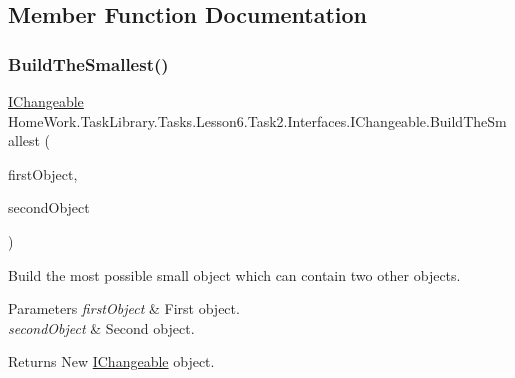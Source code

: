 \subsection{Member Function Documentation}
\mbox{\label{interface_home_work_1_1_task_library_1_1_tasks_1_1_lesson6_1_1_task2_1_1_interfaces_1_1_i_changeable_a3ec62d87fd0e526760dcf7f929ac74ae}} 
\subsubsection{\texorpdfstring{BuildTheSmallest()}{BuildTheSmallest()}}
{\footnotesize\ttfamily \mbox{\hyperlink{interface_home_work_1_1_task_library_1_1_tasks_1_1_lesson6_1_1_task2_1_1_interfaces_1_1_i_changeable}{I\+Changeable}} Home\+Work.\+Task\+Library.\+Tasks.\+Lesson6.\+Task2.\+Interfaces.\+I\+Changeable.\+Build\+The\+Smallest (\begin{DoxyParamCaption}\item[{\mbox{\hyperlink{interface_home_work_1_1_task_library_1_1_tasks_1_1_lesson6_1_1_task2_1_1_interfaces_1_1_i_changeable}{I\+Changeable}}}]{first\+Object,  }\item[{\mbox{\hyperlink{interface_home_work_1_1_task_library_1_1_tasks_1_1_lesson6_1_1_task2_1_1_interfaces_1_1_i_changeable}{I\+Changeable}}}]{second\+Object }\end{DoxyParamCaption})}



Build the most possible small object which can contain two other objects. 


\begin{DoxyParams}{Parameters}
{\em first\+Object} & First object.\\
\hline
{\em second\+Object} & Second object.\\
\hline
\end{DoxyParams}
\begin{DoxyReturn}{Returns}
New \mbox{\hyperlink{interface_home_work_1_1_task_library_1_1_tasks_1_1_lesson6_1_1_task2_1_1_interfaces_1_1_i_changeable}{I\+Changeable}} object.
\end{DoxyReturn}



